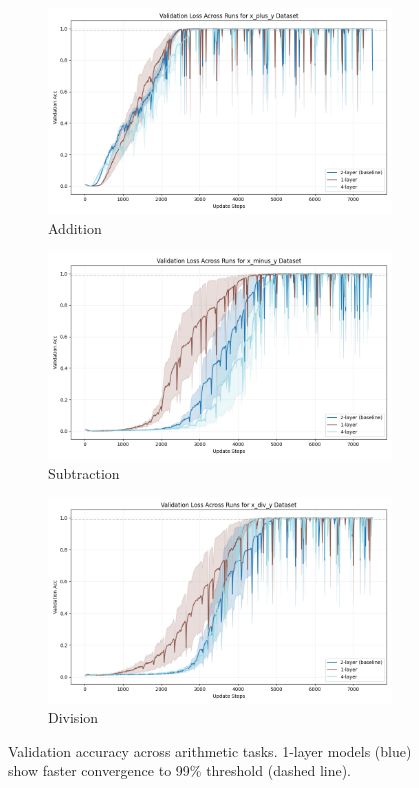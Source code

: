 \documentclass{article} %
\begin{document}
\begin{figure}[h]
    \centering
    \begin{subfigure}{0.32\textwidth}
        \includegraphics[width=\textwidth]{val_acc_x_plus_y.png}
        \caption{Addition}
    \end{subfigure}
    \begin{subfigure}{0.32\textwidth}
        \includegraphics[width=\textwidth]{val_acc_x_minus_y.png}
        \caption{Subtraction}
    \end{subfigure}
    \begin{subfigure}{0.32\textwidth}
        \includegraphics[width=\textwidth]{val_acc_x_div_y.png}
        \caption{Division}
    \end{subfigure}
    \caption{Validation accuracy across arithmetic tasks. 1-layer models (blue) show faster convergence to 99\% threshold (dashed line).}
    \label{fig:arithmetic}
\end{figure}
\end{document}

